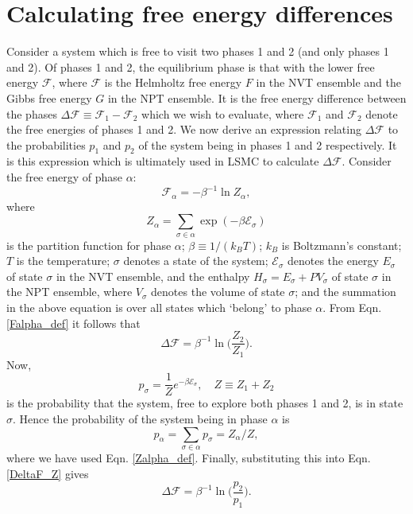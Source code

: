 \documentclass{report}
\begin{document}
\section{Calculating free energy differences}
Consider a system which is free to visit two phases 1 and 2 (and only phases 1 and 2).
Of phases 1 and 2, the equilibrium phase is that with the lower free energy $\mathcal{F}$, where $\mathcal{F}$ is the Helmholtz free energy $F$ in the 
NVT ensemble and the Gibbs free energy $G$ in the NPT ensemble. It is the free energy difference between the phases 
$\Delta\mathcal{F}\equiv \mathcal{F}_1-\mathcal{F}_2$ which we wish to evaluate, where $\mathcal{F}_1$ and $\mathcal{F}_2$ denote the free energies of 
phases 1 and 2.
We now derive an expression relating $\Delta \mathcal{F}$ to the probabilities $p_1$ and $p_2$ of the system being in phases 1 and 2 respectively.
It is this expression which is ultimately used in LSMC to calculate $\Delta \mathcal{F}$. Consider the free energy of phase $\alpha$:
\begin{equation}\label{Falpha_def}
\mathcal{F}_{\alpha}=-\beta^{-1}\ln Z_{\alpha},
\end{equation}
where
\begin{equation}\label{Zalpha_def}
Z_{\alpha}=\sum_{\sigma\in\alpha}\exp(-\beta \mathcal{E}_{\sigma})
\end{equation}
is the partition function for phase $\alpha$; $\beta\equiv 1/(k_BT)$; $k_B$ is Boltzmann's constant; $T$ is the temperature; 
$\sigma$ denotes a state of the system; $\mathcal{E}_{\sigma}$ denotes the energy $E_{\sigma}$ of state $\sigma$ in the NVT ensemble, and the enthalpy 
$H_{\sigma}=E_{\sigma}+PV_{\sigma}$ of state $\sigma$ in the NPT ensemble, where $V_{\sigma}$ denotes the volume of state $\sigma$; 
and the summation in the above equation is over all states which `belong' to phase $\alpha$. 
From Eqn. \eqref{Falpha_def} it follows that
\begin{equation}\label{DeltaF_Z}
\Delta \mathcal{F}=\beta^{-1}\ln\biggl(\frac{Z_2}{Z_1}\biggr).
\end{equation}
Now,
\begin{equation}\label{MC_prob}
p_{\sigma}=\frac{1}{Z}e^{-\beta \mathcal{E}_{\sigma}}, \quad Z\equiv Z_1+Z_2
\end{equation}
is the probability that the system, free to explore both phases 1 and 2, is in state $\sigma$. Hence the probability of the system being in
phase $\alpha$ is
\begin{equation}
p_{\alpha} = \sum_{\sigma\in \alpha}p_{\sigma} = Z_{\alpha}/Z,
\end{equation}
where we have used Eqn. \eqref{Zalpha_def}. Finally, substituting this into Eqn. \eqref{DeltaF_Z} gives
\begin{equation}\label{DeltaF_stat_mech}
\Delta \mathcal{F}=\beta^{-1}\ln\biggl(\frac{p_2}{p_1}\biggr).
\end{equation}
\end{document}
